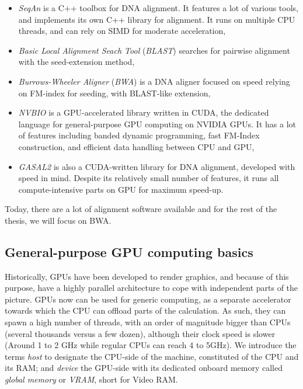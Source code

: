 \begin{itemize}
    \item \emph{SeqAn} is a C++ toolbox for DNA alignment. It features a lot of various tools, and implements its own C++ library for alignment. It runs on multiple CPU threads, and can rely on SIMD for moderate acceleration,
    \item \emph{Basic Local Alignment Seach Tool} (\emph{BLAST}) searches for pairwise alignment with the seed-extension method,
    \item \emph{Burrows-Wheeler Aligner} (\emph{BWA}) is a DNA aligner focused on speed relying on FM-index for seeding, with BLAST-like extension,
    \item \emph{NVBIO} is a GPU-accelerated library written in CUDA, the dedicated language for general-purpose GPU computing on NVIDIA GPUs. It has a lot of features including banded dynamic programming, fast FM-Index construction, and efficient data handling between CPU and GPU,
    \item \emph{GASAL2} is also a CUDA-written library for DNA alignment, developed with speed in mind. Despite its relatively small number of features, it runs all compute-intensive parts on GPU for maximum speed-up.
\end{itemize}

Today, there are a lot of alignment software available\cite{wiki:ListAlignmentSoft} and for the rest of the thesis, we will focus on BWA.

\subsection{General-purpose GPU computing basics}

Historically, GPUs have been developed to render graphics, and because of this purpose, have a highly parallel architecture to cope with independent parts of the picture. GPUs now can be used for generic computing, as a separate accelerator towards which the CPU can offload parts of the calculation. As such, they can spawn a high number of threads, with an order of magnitude bigger than CPUs (several thousands versus a few dozen), although their clock speed is slower (Around 1 to 2 GHz while regular CPUs can reach 4 to 5GHz). We introduce the terms \emph{host} to designate the CPU-side of the machine, constituted of the CPU and its RAM; and \emph{device} the GPU-side with its dedicated onboard memory called \emph{global memory} or \emph{VRAM}, short for Video RAM.

